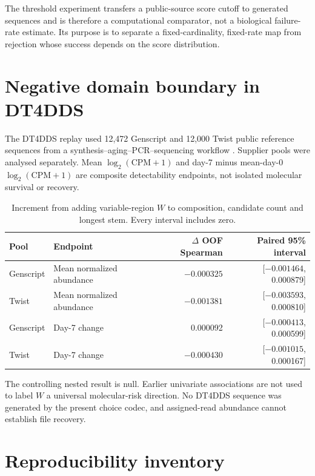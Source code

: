 \documentclass[10pt]{article}
\begin{document}
The threshold experiment transfers a public-source score cutoff to generated sequences and is therefore a computational comparator, not a biological failure-rate estimate. Its purpose is to separate a fixed-cardinality, fixed-rate map from rejection whose success depends on the score distribution.

\section{Negative domain boundary in DT4DDS}

The DT4DDS replay used 12,472 Genscript and 12,000 Twist public reference sequences from a synthesis--aging--PCR--sequencing workflow \cite{gimpel2023digitaltwin}. Supplier pools were analysed separately. Mean $\log_2(\mathrm{CPM}+1)$ and day-7 minus mean-day-0 $\log_2(\mathrm{CPM}+1)$ are composite detectability endpoints, not isolated molecular survival or recovery.

\begin{table}[H]
\centering
\small
\begin{tabular}{llrr}
\toprule
Pool & Endpoint & $\Delta$ OOF Spearman & Paired 95\% interval \\
\midrule
Genscript & Mean normalized abundance & $-0.000325$ & [$-0.001464$, 0.000879] \\
Twist & Mean normalized abundance & $-0.001381$ & [$-0.003593$, 0.000810] \\
Genscript & Day-7 change & 0.000092 & [$-0.000413$, 0.000599] \\
Twist & Day-7 change & $-0.000430$ & [$-0.001015$, 0.000167] \\
\bottomrule
\end{tabular}
\caption{Increment from adding variable-region $W$ to composition, candidate count and longest stem. Every interval includes zero.}
\label{tab:s-dt4dds}
\end{table}

The controlling nested result is null. Earlier univariate associations are not used to label $W$ a universal molecular-risk direction. No DT4DDS sequence was generated by the present choice codec, and assigned-read abundance cannot establish file recovery.

\section{Reproducibility inventory}
\end{document}
